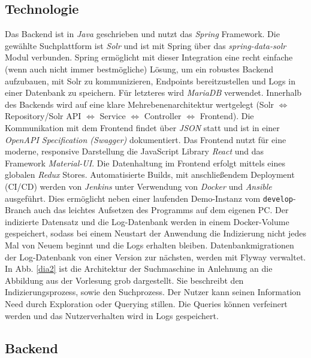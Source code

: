 \documentclass[oneside, a4paper, 12pt, titlepage]{article}
\begin{document}
\subsection{Technologie}
Das Backend ist in \textit{Java} geschrieben und nutzt das \textit{Spring} Framework. Die gewählte Suchplattform ist \textit{Solr} und ist mit Spring über das \textit{spring-data-solr} Modul verbunden. Spring ermöglicht mit dieser Integration eine recht einfache (wenn auch nicht immer bestmögliche) Lösung, um ein robustes Backend aufzubauen, mit Solr zu kommunizieren, Endpoints bereitzustellen und Logs in einer Datenbank zu speichern.
Für letzteres wird \textit{MariaDB} verwendet. Innerhalb des Backends wird auf eine klare Mehrebenenarchitektur wertgelegt (Solr $\Leftrightarrow$ Repository/Solr API $\Leftrightarrow$ Service $\Leftrightarrow$ Controller $\Leftrightarrow$ Frontend).
Die Kommunikation mit dem Frontend findet über \textit{JSON} statt und ist in einer \textit{OpenAPI Specification (Swagger)} dokumentiert.
Das Frontend nutzt für eine moderne, responsive Darstellung die JavaScript Library \textit{React} und das Framework \textit{Material-UI}. Die Datenhaltung im Frontend erfolgt mittels eines globalen \textit{Redux} Stores.
Automatisierte Builds, mit anschließendem Deployment (CI/CD) werden von \textit{Jenkins} unter Verwendung von \textit{Docker} und \textit{Ansible} ausgeführt.
Dies ermöglicht neben einer laufenden Demo-Instanz vom \texttt{develop}-Branch auch das leichtes Aufsetzen des Programms auf dem eigenen PC.
Der indizierte Datensatz und die Log-Datenbank werden in einem Docker-Volume gespeichert, sodass bei einem Neustart der Anwendung die Indizierung nicht jedes Mal von Neuem beginnt und die Logs erhalten bleiben. Datenbankmigrationen der Log-Datenbank von einer Version zur nächsten, werden mit Flyway verwaltet.\\
In Abb. \ref{dia2} ist die Architektur der Suchmaschine in Anlehnung an die Abbildung aus der Vorlesung grob dargestellt. Sie beschreibt den Indizierungsprozess, sowie den Suchprozess. Der Nutzer kann seinen Information Need durch Exploration oder Querying stillen. Die Queries können verfeinert werden und das Nutzerverhalten wird in Logs gespeichert.

\subsection{Backend}
\end{document}
